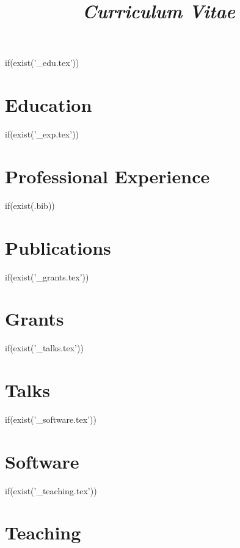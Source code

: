 \documentclass[11pt, letterpaper, sans]{moderncv}
\title{\emph{Curriculum Vitae}}
\begin{document}
\makecvtitle


if(exist('_edu.tex')) {
\section{Education}

\medskip
}

if(exist('_exp.tex')) {
\section{Professional Experience}

\medskip
}

if(exist(\jobname.bib)) {
\section{Publications}
\nocite{*}
\printbibliography[heading=subbibliography,keyword=pr,title={Peer Reviewed Publications}]
\smallskip
\printbibliography[heading=subbibliography,keyword=npr,resetnumbers=true,title={Other Publications}]
\medskip
\medskip
}
if(exist('_grants.tex')) {
\section{Grants}

\medskip
}

if(exist('_talks.tex')) {
\section{Talks}

\medskip
}

if(exist('_software.tex')) {
\section{Software}

\medskip
}

if(exist('_teaching.tex')) {
\section{Teaching}

}
\end{document}
